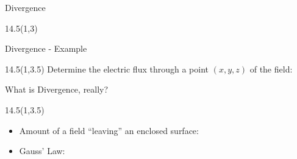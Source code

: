
\begin{frame}{Divergence}
\begin{textblock}{14.5}(1,3)
\begin{myblock}[0.9]{}


\end{myblock}

\end{textblock}

\end{frame}


\begin{frame}{Divergence - Example}
\begin{textblock}{14.5}(1,3.5)
Determine the electric flux through a point $(x, y, z)$ of the field:
\end{textblock}

\end{frame}


\begin{frame}{What is Divergence, really?}
\begin{textblock}{14.5}(1,3.5)
\begin{itemize}
	\item Amount of a field ``leaving'' an enclosed surface:
	\vspace{-8pt}
	\item Gauss' Law:
		\vspace{-8pt}
	
\end{itemize}
	\vspace{-18pt}

\end{textblock}

\end{frame}

